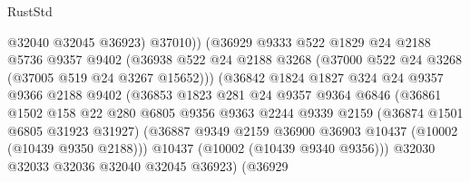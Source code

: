 \begin{lexlean}{RustStd}
\begin{coremodule}
                                  @32040
                                  @32045
                                  @36923)
                                @37010))
                            (@36929
                              @9333
                              @522
                              @1829
                              @24
                              @2188
                              @5736
                              @9357
                              @9402
                              (@36938
                                @522
                                @24
                                @2188
                                @3268
                                (@37000 @522 @24 @3268 (@37005 @519 @24 @3267 @15652)))
                              (@36842
                                @1824
                                @1827
                                @324
                                @24
                                @9357
                                @9366
                                @2188
                                @9402
                                (@36853
                                  @1823
                                  @281
                                  @24
                                  @9357
                                  @9364
                                  @6846
                                  (@36861
                                    @1502
                                    @158
                                    @22
                                    @280
                                    @6805
                                    @9356
                                    @9363
                                    @2244
                                    @9339
                                    @2159
                                    (@36874 @1501 @6805 @31923 @31927)
                                    (@36887
                                      @9349
                                      @2159
                                      @36900
                                      @36903
                                      @10437
                                      (@10002 (@10439 @9350 @2188)))
                                    @10437
                                    (@10002 (@10439 @9340 @9356)))
                                  @32030
                                  @32033
                                  @32036
                                  @32040
                                  @32045
                                  @36923)
                                (@36929

\end{coremodule}
\end{lexlean}
